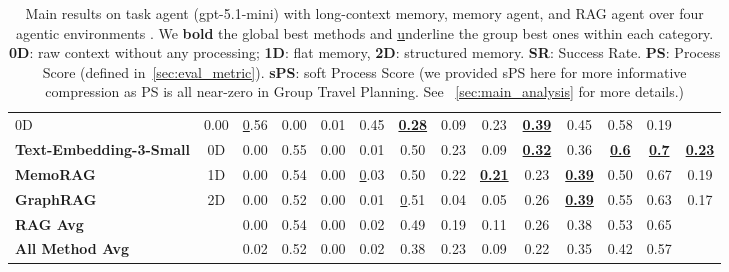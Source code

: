 \begin{table}[th]
{\begin{tabular}{@{}lccccccccccccc@{}}
  0D &
  0.00 &
  {\ul 0.56} &
  0.00 &
  0.01 &
  0.45 &
  {\ul \textbf{0.28}} &
  0.09 &
  0.23 &
  {\ul \textbf{0.39}} &
  0.45 &
  0.58 &
  0.19 \\
\textbf{Text-Embedding-3-Small} &
  0D &
  0.00 &
  0.55 &
  0.00 &
  0.01 &
  0.50 &
  0.23 &
  0.09 &
  {\ul \textbf{0.32}} &
  0.36 &
  {\ul \textbf{0.6}} &
  {\ul \textbf{0.7}} &
  {\ul \textbf{0.23}} \\
\textbf{MemoRAG} &
  1D &
  0.00 &
  0.54 &
  0.00 &
  {\ul 0.03} &
  0.50 &
  0.22 &
  {\ul \textbf{0.21}} &
  0.23 &
  {\ul \textbf{0.39}} &
  0.50 &
  0.67 &
  0.19 \\
\textbf{GraphRAG} &
  2D &
  0.00 &
  0.52 &
  0.00 &
  0.01 &
  {\ul 0.51} &
  0.04 &
  0.05 &
  0.26 &
  {\ul \textbf{0.39}} &
  0.55 &
  0.63 &
  0.17 \\
\rowcolor[HTML]{EFEFEF} \textbf{RAG Avg} &
   &
  0.00 &
  0.54 &
  0.00 &
  0.02 &
  0.49 &
  0.19 &
  0.11 &
  0.26 &
  0.38 &
  0.53 &
  0.65 &
   \\ \midrule
\textbf{All Method Avg} &
   &
  0.02 &
  0.52 &
  0.00 &
  0.02 &
  0.38 &
  0.23 &
  0.09 &
  0.22 &
  0.35 &
  0.42 &
  0.57 &
   \\ \bottomrule
\end{tabular}%
}
\caption{Main results on task agent (gpt-5.1-mini) with long-context memory, memory agent, and RAG agent over four agentic environments \ours. We \textbf{bold} the global best methods and {\ul underline} the group best ones within each category.  \textbf{0D}: raw context without any processing; \textbf{1D}: flat memory, \textbf{2D}: structured memory. \textbf{SR}: Success Rate. \textbf{PS}: Process Score (defined in~\cref{sec:eval_metric}). \textbf{sPS}: soft Process Score (we provided sPS here for more informative compression as PS is all near-zero in Group Travel Planning. See ~\cref{sec:main_analysis} for more details.) }
\label{tab:main_result}
\vspace{-15pt}
\end{table}

